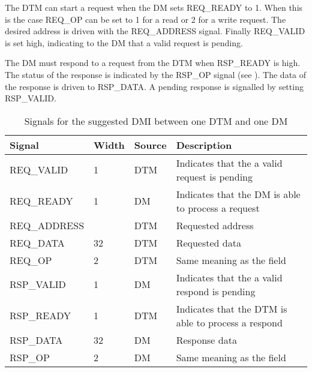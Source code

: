 The DTM can start a request when the DM sets REQ\_READY to 1.
When this is the case REQ\_OP can be set to 1 for a read or 2 for a write request.
The desired address is driven with the REQ\_ADDRESS signal.
Finally REQ\_VALID is set high, indicating to the DM that a valid request is pending.

The DM must respond to a request from the DTM when RSP\_READY is high.
The status of the response is indicated by the RSP\_OP signal (see \FdtmDmiOp).
The data of the response is driven to RSP\_DATA.
A pending response is signalled by setting RSP\_VALID.

\begin{table}[ht]\centering
	\begin{tabular}[h]{l l l l}
		\hline
		Signal 			& Width				& Source	& Description 		  \\
		\hline
		REQ\_VALID 		& 1					& DTM		& Indicates that the a valid request is pending \\
		\hline
		REQ\_READY 		& 1					& DM		& Indicates that the DM is able to process a request \\
		\hline
		REQ\_ADDRESS	& \FdtmDtmcsAbits	& DTM		& Requested address \\
		\hline
		REQ\_DATA		& 32				& DTM		& Requested data \\
		\hline
		REQ\_OP 		& 2					& DTM		& Same meaning as the \FdtmDmiOp field\\
		\hline
		RSP\_VALID 		& 1					& DM		& Indicates that the a valid respond is pending \\
		\hline
		RSP\_READY		& 1					& DTM		& Indicates that the DTM is able to process a respond \\
		\hline
		RSP\_DATA		& 32				& DM		& Response data \\
		\hline
		RSP\_OP			& 2					& DM		& Same meaning as the \FdtmDmiOp field\\
		\hline
	\end{tabular}
	\caption{Signals for the suggested DMI between one DTM and one DM \label{tab:dmi_signals}}
\end{table}

